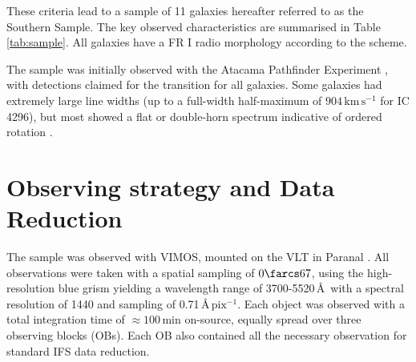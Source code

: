 \documentclass[a4paper,fleqn,usenatbib]{mnras}
\begin{document}
\begin{table}
\begin{tabular}{l c c c c l}
			\hline
			\hline
		\end{tabular}
	\end{table}

	These criteria lead to a sample of 11 galaxies hereafter referred to as the Southern Sample. The key observed characteristics are summarised in Table \ref{tab:sample}. All galaxies have a FR I radio morphology according to the \citet{Fanaroff1974} scheme. 
	
	The sample was initially observed with the Atacama Pathfinder Experiment \citep[APEX; ][]{Gusten2006}, with detections claimed for the  transition for all galaxies. Some galaxies had extremely large line widths (up to a full-width half-maximum of $904 \, \mathrm{km \, s^{-1}}$ for IC 4296), but most showed a flat or double-horn spectrum indicative of ordered rotation \citep{Prandoni2012}.

\section{Observing strategy and Data Reduction}
	\label{sec:obs}
	The sample was observed with VIMOS, mounted on the VLT in Paranal \citep{LeFevre2003}. All observations were taken with a spatial sampling of $0\farcs67$, using the high-resolution blue grism yielding a wavelength range of 3700-5520\,\AA\ with a spectral resolution of 1440 and sampling of 0.71\,\AA\,$\mathrm{pix^{-1}}$. Each object was observed with a total integration time of $\approx 100$\,min on-source, equally spread over three observing blocks (OBs). Each OB also contained all the necessary observation for standard IFS data reduction. 
\end{document}

